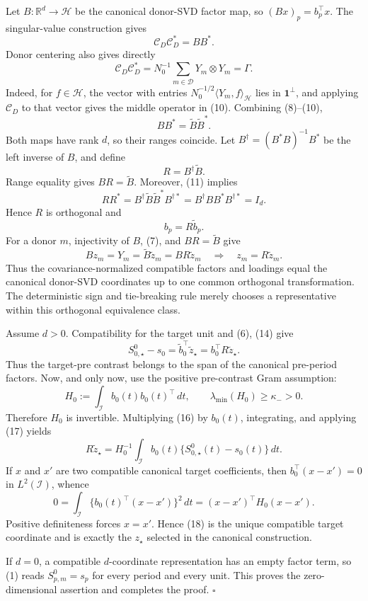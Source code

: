Let \(B:\mathbb R^d\to\mathcal H\) be the canonical donor-SVD factor map,
so \((Bx)_p=b_p^\top x\).  The singular-value construction gives
\[
 \mathcal C_D\mathcal C_D^*=BB^*.                         \tag{9}
\]
Donor centering also gives directly
\[
 \mathcal C_D\mathcal C_D^*
 =N_0^{-1}\sum_{m\in\mathcal D}Y_m\otimes Y_m=\Gamma.    \tag{10}
\]
Indeed, for \(f\in\mathcal H\), the vector with entries
\(N_0^{-1/2}\langle Y_m,f\rangle_{\mathcal H}\) lies in
\(\mathbf 1^\perp\), and applying \(\mathcal C_D\) to that vector gives the
middle operator in (10).  Combining (8)--(10),
\[
 BB^*=\widetilde B\widetilde B^*.                          \tag{11}
\]
Both maps have rank \(d\), so their ranges coincide.  Let
\(B^\dagger=(B^*B)^{-1}B^*\) be the left inverse of \(B\), and define
\[
 R=B^\dagger\widetilde B.                                 \tag{12}
\]
Range equality gives \(BR=\widetilde B\).  Moreover, (11) implies
\[
 RR^*=B^\dagger\widetilde B\widetilde B^*B^{\dagger *}
     =B^\dagger BB^*B^{\dagger *}=I_d.                    \tag{13}
\]
Hence \(R\) is orthogonal and
\[
 b_p=R\widetilde b_p.                                     \tag{14}
\]
For a donor \(m\), injectivity of \(B\), (7), and
\(BR=\widetilde B\) give
\[
 Bz_m=Y_m=\widetilde B\widetilde z_m=BR\widetilde z_m
 \quad\Longrightarrow\quad z_m=R\widetilde z_m.          \tag{15}
\]
Thus the covariance-normalized compatible factors and loadings equal the
canonical donor-SVD coordinates up to one common orthogonal transformation.
The deterministic sign and tie-breaking rule merely chooses a representative
within this orthogonal equivalence class.

Assume \(d>0\).  Compatibility for the target unit and (6), (14) give
\[
 S^0_{0,\star}-s_0
 =\widetilde b_0^\top\widetilde z_\star
 =b_0^\top R\widetilde z_\star.                           \tag{16}
\]
Thus the target-pre contrast belongs to the span of the canonical pre-period
factors.  Now, and only now, use the positive pre-contrast Gram assumption:
\[
 H_0:=\int_{\mathcal I}b_0(t)b_0(t)^\top\,dt,
 \qquad \lambda_{\min}(H_0)\geq\kappa_->0.               \tag{17}
\]
Therefore \(H_0\) is invertible.  Multiplying (16) by \(b_0(t)\), integrating,
and applying (17) yields
\[
 R\widetilde z_\star
 =H_0^{-1}\int_{\mathcal I}b_0(t)
 \{S^0_{0,\star}(t)-s_0(t)\}\,dt.                        \tag{18}
\]
If \(x\) and \(x'\) are two compatible canonical target coefficients, then
\(b_0^\top(x-x')=0\) in \(L^2(\mathcal I)\), whence
\[
 0=\int_{\mathcal I}\{b_0(t)^\top(x-x')\}^2\,dt
  =(x-x')^\top H_0(x-x').                                 \tag{19}
\]
Positive definiteness forces \(x=x'\).  Hence (18) is the unique compatible
target coordinate and is exactly the \(z_\star\) selected in the canonical
construction.

If \(d=0\), a compatible \(d\)-coordinate representation has an empty factor
term, so (1) reads \(S^0_{p,m}=s_p\) for every period and every unit.  This proves
the zero-dimensional assertion and completes the proof. \(\square\)